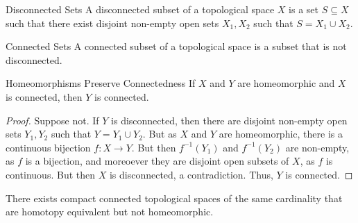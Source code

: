\documentclass[crop=false,class=book,oneside]{standalone}
\begin{document}
            \begin{ldefinition}{Disconnected Sets}
                A disconnected subset of a topological space $X$
                is a set $S\subseteq{X}$ such that there exist
                disjoint non-empty open sets $X_{1},X_{2}$ such
                that $S=X_{1}\cup{X_{2}}$.
            \end{ldefinition}
            \begin{ldefinition}{Connected Sets}
                A connected subset of a topological space
                is a subset that is not disconnected.
            \end{ldefinition}
            \begin{ltheorem}{Homeomorphisms Preserve Connectedness}
                If $X$ and $Y$ are homeomorphic and
                $X$ is connected, then $Y$ is connected.
            \end{ltheorem}
            \begin{proof}
                Suppose not. If $Y$ is disconnected, then
                there are disjoint non-empty open sets $Y_{1},Y_{2}$
                such that $Y=Y_{1}\cup{Y_{2}}$. But as $X$ and $Y$
                are homeomorphic, there is a continuous bijection
                $f:X\rightarrow{Y}$. But then
                $f^{-1}(Y_{1})$ and $f^{-1}(Y_{2})$ are
                non-empty, as $f$ is a bijection, and moreoever
                they are disjoint open subsets of $X$, as
                $f$ is continuous. But then $X$ is disconnected,
                a contradiction. Thus, $Y$ is connected.
            \end{proof}
            \begin{theorem}
                There exists compact connected topological spaces of
                the same cardinality that are homotopy equivalent but
                not homeomorphic.
            \end{theorem}
\end{document}
